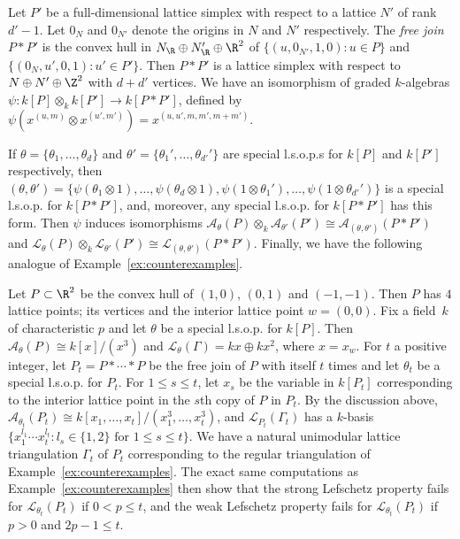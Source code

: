 Let $P'$ be a full-dimensional lattice simplex with respect to a lattice $N'$ of rank~\mbox{$d' - 1$}. Let $0_N$ and $0_{N'}$ denote the origins in $N$ and $N'$ respectively. 
The \emph{free join} $P*P'$ is the 
convex hull in $N_\R \oplus N_\R' \oplus \R^2$ of $\{ (u,0_{N'},1,0) : u \in P \}$ and $\{ (0_{N},u',0,1) : u' \in P' \}$. Then $P*P'$ is a 
lattice simplex  with respect to $N \oplus N' \oplus \Z^2$ with $d + d'$ vertices. We have an isomorphism of graded $k$-algebras $\psi \colon  k[P] \otimes_k k[P'] \to k[P * P']$, defined by $\psi(x^{(u,m)} \otimes x^{(u',m')}) = x^{(u,u',m,m',m + m')}$. 
	
	If $\theta = \{ \theta_1,\ldots,\theta_d \}$ and $\theta' = \{ \theta_1',\ldots,\theta_{d'}'\}$ are special l.s.o.p.s for $k[P]$ and $k[P']$ respectively, then $(\theta,\theta') = \{ \psi(\theta_1 \otimes 1), \ldots,  \psi(\theta_d \otimes 1), \psi(1 \otimes \theta_1'), \ldots, \psi(1 \otimes \theta_{d'}') \}$ is a special l.s.o.p. for  $k[P * P']$, and,   moreover,  any special l.s.o.p. for $k[P * P']$ has this form. Then $\psi$ induces isomorphisms 
	$\mathscr{A}_\theta(P) \otimes_k \mathscr{A}_{\theta'}(P') \cong 
	\mathscr{A}_{(\theta,\theta')}(P*P')$ and 
	$\mathscr{L}_\theta(P) \otimes_k \mathscr{L}_{\theta'}(P') \cong 
\mathscr{L}_{(\theta,\theta')}(P*P')$. Finally, we have the following analogue of Example~\ref{ex:counterexamples}. 

\begin{example}\label{ex:ehrhart}
Let $P \subset \R^2$ be the convex hull of $(1,0)$, $(0,1)$ and $(-1,-1)$. Then $P$ has $4$ lattice points; its vertices and the interior lattice point $w = (0,0)$. 
Fix a field~$k$ of characteristic $p$ and let $\theta$ be a special l.s.o.p. for $k[P]$. 
Then $\mathscr{A}_\theta(P) \cong k[x]/(x^3)$ and $\mathscr{L}_\theta(\Gamma) = k x \oplus k x^2$, where $x = x_w$. 
For $t$ a positive integer, let $P_t = P * \cdots * P$ be the free join of $P$ with itself $t$ times and let $\theta_t$ be a special l.s.o.p. for $P_t$. 
For $1 \le s \le t$,  let $x_s$ be the variable in $k[P_t]$ corresponding to the interior lattice point in the $s$th copy of $P$ in $P_t$. 
By the discussion above,
$\mathscr{A}_{\theta_t}(P_t) \cong k[x_1,\ldots,x_t]/(x_1^3,\ldots,x_t^3)$, and 
$\mathscr{L}_{P_t}(\Gamma_t)$ has a $k$-basis $\{ x_1^{l_1}\cdots x_t^{l_t} : l_s \in \{ 1,2 \} \textrm{ for } 1 \le s \le t \}$.
We have a natural unimodular lattice triangulation $\Gamma_t$ of $P_t$ corresponding to the regular triangulation of Example~\ref{ex:counterexamples}.
The exact same computations as Example~\ref{ex:counterexamples} then show that 
the strong Lefschetz property fails for  $\mathscr{L}_{\theta_t}(P_t)$ if $0 < p \le t$, and the weak Lefschetz property fails for  $\mathscr{L}_{\theta_t}(P_t)$ if $p > 0$ and $2p - 1 \le t$.
\end{example}

